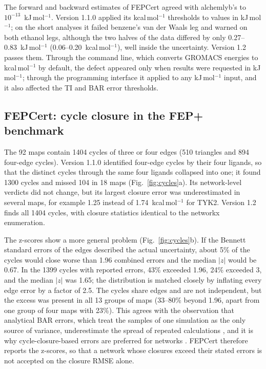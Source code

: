 \documentclass[9pt,lessons]{livecoms}
\begin{document}
The forward and backward estimates of FEPCert agreed with alchemlyb's to $10^{-13}$~kJ\,mol$^{-1}$. Version 1.1.0 applied its kcal\,mol$^{-1}$ thresholds to values in kJ\,mol$^{-1}$; on the short analyses it failed benzene's van der Waals leg and warned on both ethanol legs, although the two halves of the data differed by only 0.27--0.83~kJ\,mol$^{-1}$ (0.06--0.20~kcal\,mol$^{-1}$), well inside the uncertainty. Version 1.2 passes them. Through the command line, which converts GROMACS energies to kcal\,mol$^{-1}$ by default, the defect appeared only when results were requested in kJ\,mol$^{-1}$; through the programming interface it applied to any kJ\,mol$^{-1}$ input, and it also affected the TI and BAR error thresholds.

\subsection{FEPCert: cycle closure in the FEP+ benchmark}
The 92 maps contain 1404 cycles of three or four edges (510 triangles and 894 four-edge cycles). Version 1.1.0 identified four-edge cycles by their four ligands, so that the distinct cycles through the same four ligands collapsed into one; it found 1300 cycles and missed 104 in 18 maps (Fig.~\ref{fig:cycles}a). Its network-level verdicts did not change, but its largest closure error was underestimated in several maps, for example 1.25 instead of 1.74~kcal\,mol$^{-1}$ for TYK2. Version 1.2 finds all 1404 cycles, with closure statistics identical to the networkx enumeration.

The z-scores show a more general problem (Fig.~\ref{fig:cycles}b). If the Bennett standard errors of the edges described the actual uncertainty, about 5\% of the cycles would close worse than 1.96 combined errors and the median $|z|$ would be 0.67. In the 1399 cycles with reported errors, 43\% exceeded 1.96, 24\% exceeded 3, and the median $|z|$ was 1.65; the distribution is matched closely by inflating every edge error by a factor of 2.5. The cycles share edges and are not independent, but the excess was present in all 13 groups of maps (33--80\% beyond 1.96, apart from one group of four maps with 23\%). This agrees with the observation that analytical BAR errors, which treat the samples of one simulation as the only source of variance, underestimate the spread of repeated calculations \cite{bhati2018,wan2020}, and it is why cycle-closure-based errors are preferred for networks \cite{wang2013,wang2015}. FEPCert therefore reports the z-scores, so that a network whose closures exceed their stated errors is not accepted on the closure RMSE alone.
\end{document}
